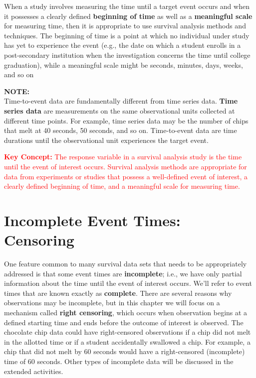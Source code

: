\documentclass[
]{report}
\begin{document}
When a study involves measuring the time until a target event occurs and when it possesses a clearly
defined \textbf{beginning of time} as well as a \textbf{meaningful scale} for measuring time, then it is appropriate to use
survival analysis methods and techniques. The beginning of time is a point at which no individual under study
has yet to experience the event (e.g., the date on which a student enrolls in a post-secondary institution when
the investigation concerns the time until college graduation), while a meaningful scale might be seconds,
minutes, days, weeks, and so on

\large

\textbf{NOTE:}\\
Time-to-event data are fundamentally different from time series data. \textbf{Time series data} are measurements on the same observational units collected at different time points. For example, time series data may be the number of chips that melt at 40 seconds, 50 seconds, and so on. Time-to-event data are time durations until the observational unit experiences the target event.\\
\normalsize

\large

\textbf{\textcolor{red}{Key Concept:}}
\textcolor{red}{The response variable in a survival analysis study is the time until the event of interest occurs. Survival analysis methods are appropriate for data from experiments or studies that possess a well-defined event of interest, a clearly defined beginning of time, and a meaningful scale for measuring time.}
\normalsize

\section*{Incomplete Event Times: Censoring}\label{incomplete-event-times-censoring}

One feature common to many survival data sets that needs to be appropriately addressed is that some event times are \textbf{incomplete}; i.e., we have only partial information about the time until the event of interest occurs. We'll refer to event times that are known exactly as \textbf{complete}. There are several reasons why observations may be incomplete, but in this chapter we will focus on a mechanism called \textbf{right censoring}, which occurs when observation begins at a defined starting time and ends before the outcome of interest is observed. The chocolate chip data could have right-censored observations if a chip did not melt in the allotted time or if a student accidentally swallowed a chip. For example, a chip that did not melt by 60 seconds would have a right-censored (incomplete) time of 60 seconds. Other types of incomplete data will be discussed in the extended activities.
\end{document}
